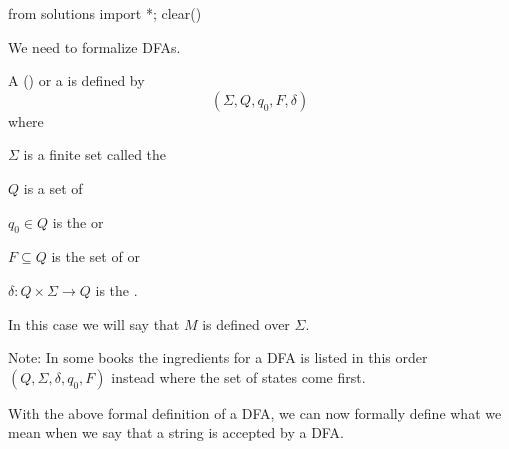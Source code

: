 \begin{python0}
from solutions import *; clear()
\end{python0}

We need to formalize DFAs.

\begin{defn}
  A 
  (\sidebarskip{16pt})
  or a
  \sidebarskip{8pt}\sidebarskip{4pt}
  is defined by
  \[
  (\Sigma,Q,q_0,F,\delta)
  \]
  where
  \begin{tightlist}
  \item $\Sigma$ is a finite set called the
  \item $Q$ is a set of 
  \item $q_0 \in Q$ is the
    or
    \sidebarskip{12pt}
  \item $F \subseteq Q$ is the set of 
    or
    \sidebarskip{18pt}
  \item $\delta : Q \times \Sigma \rightarrow Q$ is the
    .
  \end{tightlist}
  In this case we will say that $M$ is defined over $\Sigma$.
\end{defn}

Note: In some books the ingredients
for a DFA is listed in this order $(Q, \Sigma, \delta, q_0, F)$
instead where the set of states come first.



\newpage
With the above formal definition of a DFA, we can now formally
define what we mean when we say that a string is accepted by a
DFA.

